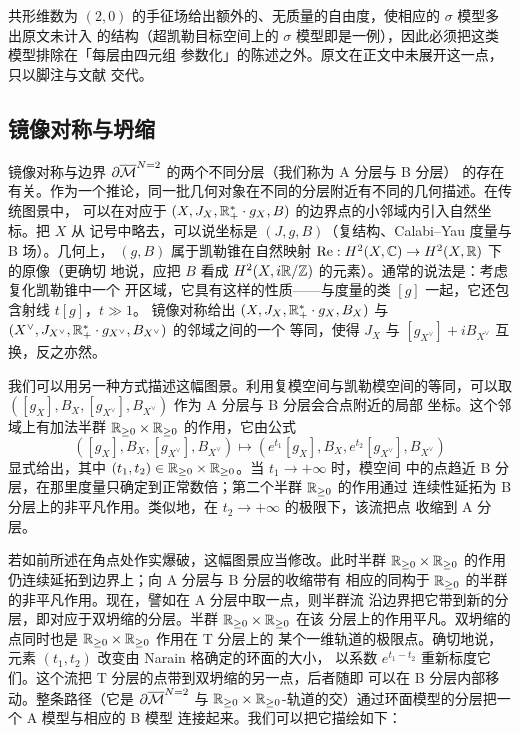\begin{yizhu}
共形维数为 $(2,0)$ 的手征场给出额外的、无质量的自由度，使相应的 $\sigma$ 模型多出原文未计入
的结构（超凯勒目标空间上的 $\sigma$ 模型即是一例），因此必须把这类模型排除在「每层由四元组
参数化」的陈述之外。原文在正文中未展开这一点，只以脚注与文献 \cite{AM} 交代。
\end{yizhu}

\subsection{镜像对称与坍缩}

镜像对称与边界 $\partial\overline{\mathcal{M}}^{N=2}$ 的两个不同分层（我们称为 A 分层与 B 分层）
的存在有关。作为一个推论，同一批几何对象在不同的分层附近有不同的几何描述。在传统图景中，
可以在对应于 $(X,J_X,\mathbb{R}^*_+\cdot g_X,B)$ 的边界点的小邻域内引入自然坐标。把 $X$ 从
记号中略去，可以说坐标是 $(J,g,B)$（复结构、Calabi--Yau 度量与 B 场）。几何上，
$(g,B)$ 属于凯勒锥在自然映射 $\mathrm{Re}:H^2(X,\mathbb{C})\to H^2(X,\mathbb{R})$ 下的原像（更确切
地说，应把 $B$ 看成 $H^2(X,i\mathbb{R}/\mathbb{Z})$ 的元素）。通常的说法是：考虑复化凯勒锥中一个
开区域，它具有这样的性质——与度量的类 $[g]$ 一起，它还包含射线 $t[g]$，$t\gg1$。
镜像对称给出 $(X,J_X,\mathbb{R}^*_+\cdot g_X,B_X)$ 与
$(X^{\vee},J_{X^{\vee}},\mathbb{R}^*_+\cdot g_{X^{\vee}},B_{X^{\vee}})$ 的邻域之间的一个
等同，使得 $J_X$ 与 $[g_{X^{\vee}}]+iB_{X^{\vee}}$ 互换，反之亦然。

我们可以用另一种方式描述这幅图景。利用复模空间与凯勒模空间的等同，可以取
$([g_X],B_X,[g_{X^{\vee}}],B_{X^{\vee}})$ 作为 A 分层与 B 分层会合点附近的局部
坐标。这个邻域上有加法半群 $\mathbb{R}_{\ge0}\times\mathbb{R}_{\ge0}$ 的作用，它由公式
\[
  ([g_X],B_X,[g_{X^{\vee}}],B_{X^{\vee}})
  \longmapsto
  (e^{t_1}[g_X],B_X,e^{t_2}[g_{X^{\vee}}],B_{X^{\vee}})
\]
显式给出，其中 $(t_1,t_2)\in\mathbb{R}_{\ge0}\times\mathbb{R}_{\ge0}$。当 $t_1\to+\infty$ 时，模空间
中的点趋近 B 分层，在那里度量只确定到正常数倍；第二个半群 $\mathbb{R}_{\ge0}$ 的作用通过
连续性延拓为 B 分层上的非平凡作用。类似地，在 $t_2\to+\infty$ 的极限下，该流把点
收缩到 A 分层。

若如前所述在角点处作实爆破，这幅图景应当修改。此时半群
$\mathbb{R}_{\ge0}\times\mathbb{R}_{\ge0}$ 的作用仍连续延拓到边界上；向 A 分层与 B 分层的收缩带有
相应的同构于 $\mathbb{R}_{\ge0}$ 的半群的非平凡作用。现在，譬如在 A 分层中取一点，则半群流
沿边界把它带到新的分层，即对应于双坍缩的分层。半群 $\mathbb{R}_{\ge0}\times\mathbb{R}_{\ge0}$ 在该
分层上的作用平凡。双坍缩的点同时也是 $\mathbb{R}_{\ge0}\times\mathbb{R}_{\ge0}$ 作用在 T 分层上的
某个一维轨道的极限点。确切地说，元素 $(t_1,t_2)$ 改变由 Narain 格确定的环面的大小，
以系数 $e^{t_1-t_2}$ 重新标度它们。这个流把 T 分层的点带到双坍缩的另一点，后者随即
可以在 B 分层内部移动。整条路径（它是 $\partial\overline{\mathcal{M}}^{N=2}$ 与
$\mathbb{R}_{\ge0}\times\mathbb{R}_{\ge0}$-轨道的交）通过环面模型的分层把一个 A 模型与相应的 B 模型
连接起来。我们可以把它描绘如下：

